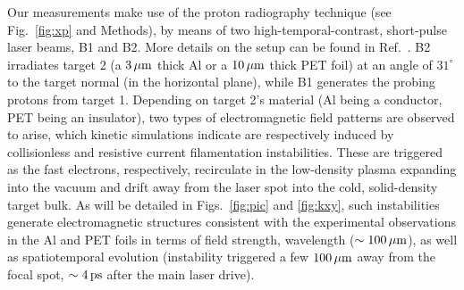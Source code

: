 \documentclass[aps,twocolumn,showpacs,superscriptaddress]{revtex4}
\begin{document}
Our measurements make use of the proton radiography technique (see Fig.~\ref{fig:xp} and Methods), by means of two high-temporal-contrast, short-pulse laser beams, B1 and B2. More details on the setup can be found in Ref.~\cite{RSI_Albertazzi_2015}.
B2 irradiates target 2 (a $3\,\rm \mu m$ thick Al or a $10\,\rm \mu m$ thick PET foil) at an angle of $31^\circ$ to the target normal (in the horizontal plane), while B1 generates the probing protons from target 1. Depending on target 2's material (Al being a conductor, PET being an insulator), two types of electromagnetic field patterns are observed to arise, which kinetic simulations indicate are respectively induced by collisionless and resistive current filamentation instabilities. These are triggered as the fast electrons, respectively, recirculate in the low-density plasma expanding into the vacuum and drift away from the laser spot into the cold, solid-density target bulk. As will be detailed in Figs.~\ref{fig:pic} and \ref{fig:kxy}, such instabilities generate electromagnetic structures consistent with the experimental observations in the Al and PET foils in terms of field strength, wavelength ($\sim 100\,\rm \mu m$), as well as spatiotemporal evolution (instability triggered a few $100\,\rm \mu m$ away from the focal spot, $\sim 4\,\rm ps$ after the main laser drive).
%
\end{document}
